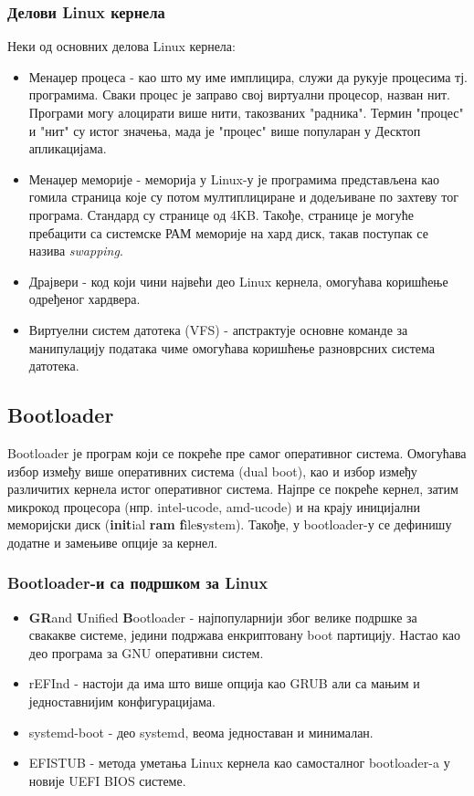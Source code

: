 \documentclass[a4paper,14pt]{article}
\begin{document}
\subsubsection{Делови Linux кернела}
Неки од основних делова Linux кернела\cite{devibm}:
\begin{itemize}
\item Менаџер процеса - као што му име имплицира, служи да рукује процесима тј. програмима. Сваки процес је заправо свој виртуални процесор, назван нит. Програми могу алоцирати више нити, такозваних "радника". Термин "процес" и "нит" су истог значења, мада је "процес" више популаран у Десктоп апликацијама.
\item Менаџер меморије - меморија у Linux-у је програмима представљена као гомила страница које су потом мултиплициране и додељиване по захтеву тог програма. Стандард су странице од 4KB. Такође, странице је могуће пребацити са системске РАМ меморије на хард диск, такав поступак се назива \textit{swapping}.
\item Драјвери - код који чини највећи део Linux кернела, омогућава коришћење одређеног хардвера.
\item Виртуелни систем датотека (VFS) - апстрактује основне команде за манипулацију података чиме омогућава коришћење разноврсних система датотека.
\end{itemize}
\newpage

\subsection{Bootloader}
Bootloader је програм који се покреће пре самог оперативног система. Омогућава избор између више оперативних система (dual boot), као и избор између различитих кернела истог оперативног система. Најпре се покреће кернел, затим микрокод процесора (нпр. intel-ucode, amd-ucode) и на крају иницијални меморијски диск (\textbf{init}ial \textbf{ram} \textbf{f}ile\textbf{s}ystem). Такође, у bootloader-у се дефинишу додатне и замењиве опције за кернел.
\subsubsection{Bootloader-и са подршком за Linux}
\begin{itemize}
\item \textbf{GR}and \textbf{U}nified \textbf{B}ootloader - најпопуларнији због велике подршке за свакакве системе, једини подржава енкриптовану boot партицију. Настао као део програма за GNU оперативни систем.
\item rEFInd - настоји да има што више опција као GRUB али са мањим и једноставнијим конфигурацијама.
\item systemd-boot - део systemd, веома једноставан и минималан.
\item EFISTUB - метода уметања Linux кернела као самосталног bootloader-a у новије UEFI BIOS системе.
\end{itemize}
\end{document}
